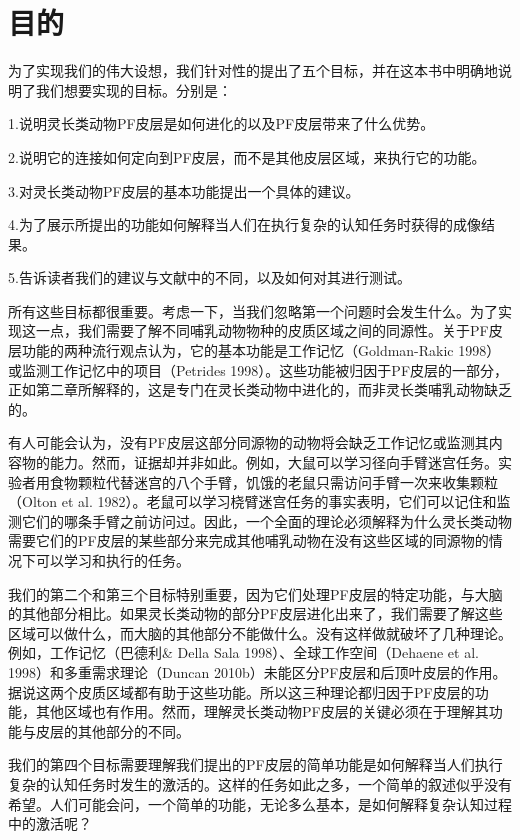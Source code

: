 \section{目的}
为了实现我们的伟大设想，我们针对性的提出了五个目标，并在这本书中明确地说明了我们想要实现的目标。分别是：
\par 
  1.说明灵长类动物PF皮层是如何进化的以及PF皮层带来了什么优势。 
\par 2.说明它的连接如何定向到PF皮层，而不是其他皮层区域，来执行它的功能。 
\par 3.对灵长类动物PF皮层的基本功能提出一个具体的建议。
\par 4.为了展示所提出的功能如何解释当人们在执行复杂的认知任务时获得的成像结果。
\par  5.告诉读者我们的建议与文献中的不同，以及如何对其进行测试。
\par 
所有这些目标都很重要。考虑一下，当我们忽略第一个问题时会发生什么。为了实现这一点，我们需要了解不同哺乳动物物种的皮质区域之间的同源性。关于PF皮层功能的两种流行观点认为，它的基本功能是工作记忆（Goldman-Rakic 1998）或监测工作记忆中的项目（Petrides 1998）。这些功能被归因于PF皮层的一部分，正如第二章所解释的，这是专门在灵长类动物中进化的，而非灵长类哺乳动物缺乏的。
\par 
有人可能会认为，没有PF皮层这部分同源物的动物将会缺乏工作记忆或监测其内容物的能力。然而，证据却并非如此。例如，大鼠可以学习径向手臂迷宫任务。实验者用食物颗粒代替迷宫的八个手臂，饥饿的老鼠只需访问手臂一次来收集颗粒（Olton et al. 1982）。老鼠可以学习桡臂迷宫任务的事实表明，它们可以记住和监测它们的哪条手臂之前访问过。因此，一个全面的理论必须解释为什么灵长类动物需要它们的PF皮层的某些部分来完成其他哺乳动物在没有这些区域的同源物的情况下可以学习和执行的任务。
\par
我们的第二个和第三个目标特别重要，因为它们处理PF皮层的特定功能，与大脑的其他部分相比。如果灵长类动物的部分PF皮层进化出来了，我们需要了解这些区域可以做什么，而大脑的其他部分不能做什么。没有这样做就破坏了几种理论。例如，工作记忆（巴德利\& Della Sala 1998）、全球工作空间（Dehaene et al. 1998）和多重需求理论（Duncan 2010b）未能区分PF皮层和后顶叶皮层的作用。据说这两个皮质区域都有助于这些功能。所以这三种理论都归因于PF皮层的功能，其他区域也有作用。然而，理解灵长类动物PF皮层的关键必须在于理解其功能与皮层的其他部分的不同。
\par
我们的第四个目标需要理解我们提出的PF皮层的简单功能是如何解释当人们执行复杂的认知任务时发生的激活的。这样的任务如此之多，一个简单的叙述似乎没有希望。人们可能会问，一个简单的功能，无论多么基本，是如何解释复杂认知过程中的激活呢？
\par
